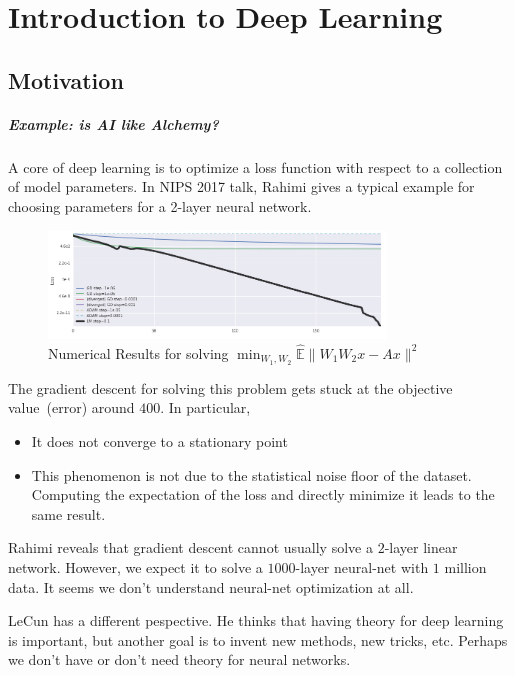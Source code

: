 \chapter{Introduction to Deep Learning}

\section{Motivation}
\paragraph{Example: is AI like Alchemy?}

A core of deep learning is to optimize a loss function with respect to a collection of model parameters. In NIPS 2017 talk, Rahimi gives a typical example for choosing parameters for a 2-layer neural network.
\begin{figure}[H]
\centering
\includegraphics[width=0.8\textwidth]{First_lecture/p_1.jpg}
\caption{Numerical Results for solving $\min_{W_1,W_2}\hat{\mathbb{E}}\|W_1W_2x-Ax\|^2$}
\end{figure}
The gradient descent for solving this problem gets stuck at the objective value~(error) around $400$. In particular,
\begin{itemize}
\item
It does not converge to a stationary point
\item
This phenomenon is not due to the statistical noise floor of the dataset. Computing the expectation of the loss and directly minimize it leads to the same result.
\end{itemize}
Rahimi reveals that gradient descent cannot usually solve a $2$-layer linear network. However, we expect it to solve a $1000$-layer neural-net with $1$ million data.
It seems we don't understand neural-net optimization at all. 

LeCun has a different pespective. He thinks that having theory for deep learning is important, but another goal is to invent new methods, new tricks, etc. Perhaps we don't have or don't need theory for neural networks.


